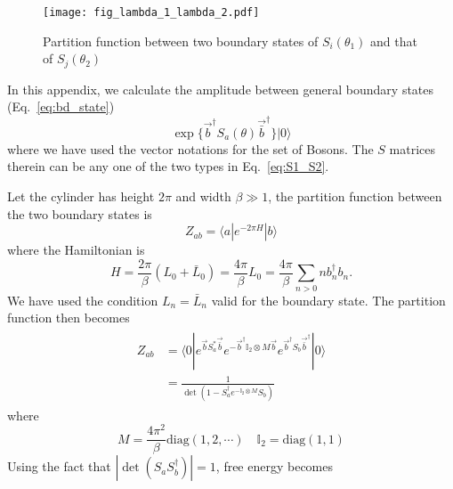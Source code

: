 
\begin{figure}[h]
\centering
\texttt{[image: fig\_lambda\_1\_lambda\_2.pdf]}
\caption{Partition function between two boundary states of $S_i( \theta_1)$ and that of $S_j( \theta_2 )$}
\label{fig:fig_lambda_1_lambda_2}
\end{figure}

In this appendix, we calculate the amplitude between general boundary states (\cf  Eq.~\eqref{eq:bd_state})
\begin{equation}
\exp\Big\{  \vec{b}^{\dagger} S_a( \theta )   \vec{\bar{b}}^{\dagger}\Big\}  |0  \rangle
\end{equation}
where we have used the vector notations for the set of Bosons. The $S$ matrices therein can be any one of the two types in Eq.~\eqref{eq:S1_S2}. 

Let the cylinder has height $2\pi$ and width $\beta \gg 1 $, the partition function between the two boundary states is
\begin{equation}
Z_{ab} =  \langle a | e^{ - 2\pi H } |b \rangle 
\end{equation}
where the Hamiltonian is
\begin{equation}
H = \frac{2\pi}{\beta} (L_0 + \bar{L}_0) =  \frac{4\pi}{\beta}  L_0 = \frac{4\pi}{\beta}\sum_{n > 0 }  n b_n^{\dagger} b_n. 
\end{equation}
We have used the condition $L_n = \bar{L}_n$ valid for the boundary state. The partition function then becomes
\begin{eqnarray}\begin{aligned}
Z_{ab} &= \langle 0 | e^{ \vec{b} S_a^* \vec{\bar{b}} } e^{ - \vec{b}^{\dagger} \mathbb{I}_2 \otimes M  \vec{b} } e^{  \vec{b}^{\dagger} S_b  \vec{\bar{b}}^{\dagger} }  |0  \rangle  \\
&= \frac{1}{\det ( 1 - S^{\dagger} _a  e^{- \mathbb{I}_2 \otimes M} S_b) }
\end{aligned}\end{eqnarray}
where
\begin{equation}
M =  \frac{4\pi^2}{\beta} \text{diag}( 1, 2, \cdots ) \quad  \mathbb{I}_2 = \text{diag}( 1, 1) 
\end{equation}
Using the fact that $|\det( S_a S_b^{\dagger})|  = 1$, free energy becomes
